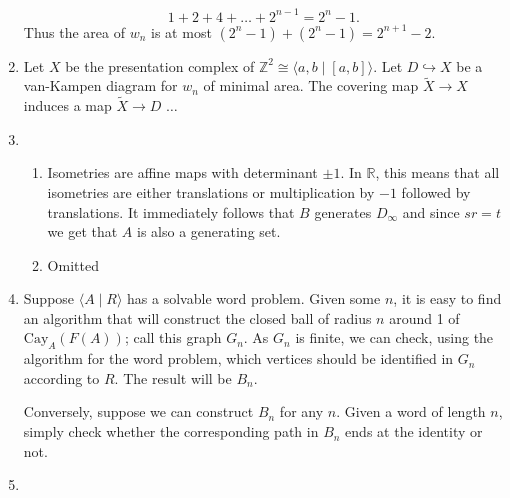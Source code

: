 \documentclass{article}
\theoremstyle{definition}
\theoremstyle{plain}
\theoremstyle{definition}
\begin{document}
\begin{enumerate}
		\[
			1 + 2 + 4+ \ldots + 2^{n-1} = 2^n -1.
		\]
		Thus the area of $w_n$ is at most $(2^n - 1) + (2^n -1) = 2^{n+1} - 2$.
		\item Let $X$ be the presentation complex of $\mathbb{Z}^2 \cong \langle a,b \mid [a,b]\rangle$. Let $D\hookrightarrow X$ be a van-Kampen diagram for $w_n$ of minimal area. The covering map $\tilde{X}\to X$ induces a map $\tilde{X}\to D$ $\ldots$
		\item \begin{enumerate}
			\item Isometries are affine maps with determinant $\pm 1$. In $\mathbb{R}$, this means that all isometries are either translations or multiplication by $-1$ followed by translations. It immediately follows that $B$ generates $D_{\infty}$ and since $sr= t$ we get that $A$ is also a generating set.
			\item Omitted 
		\end{enumerate}
		\item Suppose $\langle A\mid R\rangle$ has a solvable word problem. Given some $n$, it is easy to find an algorithm that will construct the closed ball of radius $n$ around 1 of $\text{Cay}_A(F(A))$; call this graph $G_n$. As $G_n$ is finite, we can check, using the algorithm for the word problem, which vertices should be identified in $G_n$ according to $R$. The result will be $B_n$.
		
		Conversely, suppose we can construct $B_n$ for any $n$. Given a word of length $n$, simply check whether the corresponding path in $B_n$ ends at the identity or not.
		\item 
	\end{enumerate}
\end{document}

